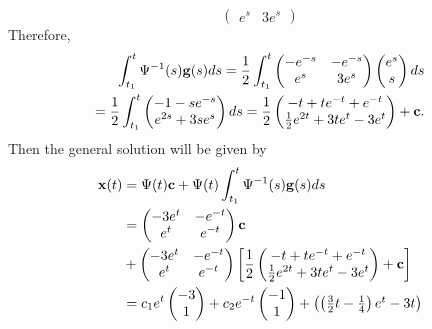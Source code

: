 \documentclass[11pt,a4paper]{article}
\begin{document}
\begin{enumerate}
$$\begin{pmatrix}
			e^s & 3e^s
		\end{pmatrix}
		$$
		Therefore,
		\begin{align*}
			\int_{t_1}^t \Psi^{-1}(s)\vb{g}(s)ds = \frac{1}{2}\int_{t_1}^t
			\begin{pmatrix}
				-e^{-s} & -e^{-s}\\
				e^s & 3e^s
			\end{pmatrix}
			\begin{pmatrix}
				e^s\\
				s
			\end{pmatrix}ds\\
			= \frac{1}{2}\int_{t_1}^t
			\begin{pmatrix}
				-1 -se^{-s}\\
				e^{2s} + 3se^s
			\end{pmatrix}ds = \frac{1}{2}
			\begin{pmatrix}
				-t + te^{-t} + e^{-t}\\
				\frac{1}{2}e^{2t} + 3te^t - 3e^t
			\end{pmatrix} + \vb{c.}
		\end{align*}
		Then the general solution will be given by
		\begin{align*}
			\vb{x}(t)
			&= \Psi(t)\vb{c} + \Psi(t)\int_{t_1}^t \Psi^{-1}(s)\vb{g}(s)ds\\
			&= 
			\begin{pmatrix}
				-3e^t & -e^{-t}\\
				e^t & e^{-t}
			\end{pmatrix}\vb{c}\\
			&+
			\begin{pmatrix}
				-3e^t & -e^{-t}\\
				e^t & e^{-t}
			\end{pmatrix}
			\left[
				\frac{1}{2}
				\begin{pmatrix}
					-t + te^{-t} + e^{-t}\\
					\frac{1}{2}e^{2t} + 3te^t - 3e^t
				\end{pmatrix} + \vb{c}
			\right]\\
			&= c_1e^t
			\begin{pmatrix}
				-3\\
				1
			\end{pmatrix} + c_2e^{-t}
			\begin{pmatrix}
				-1\\
				1
			\end{pmatrix} +
			\begin{pmatrix}
				\left(\frac{3}{2}t - \frac{1}{4}\right)e^t - 3t\\

\end{pmatrix}
\end{align*}
\end{enumerate}
\end{document}
